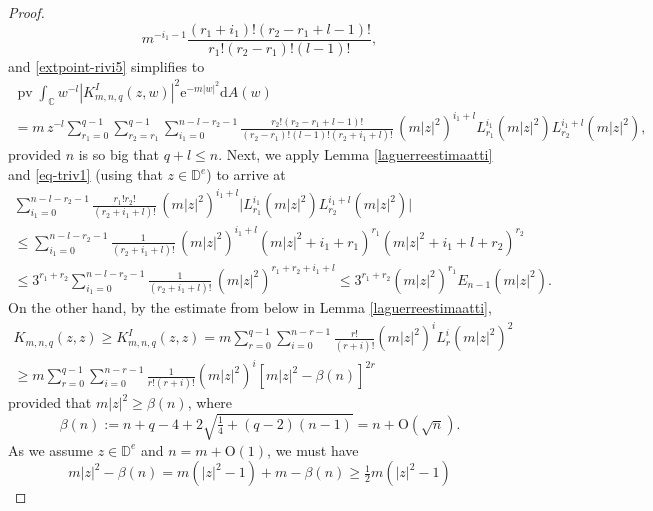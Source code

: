 \documentclass{birkart}
\theoremstyle{definition}
\theoremstyle{remark}
\numberwithin{equation}{section}
\numberwithin{figure}{section}
\newcommand{\e}{\mathrm e}
\newcommand{\1}{{\mathbf 1}}
\newcommand{\Rpar}{q}
\newcommand{\D}{{\mathbb D}}
\newcommand{\Ordo}{\mathrm{O}}
\newcommand{\diff}{{\mathrm d}}
\newcommand{\pv}{\operatorname{\mathrm{pv}}}
\begin{document}
\begin{proof}
\[m^{-i_1-1}\frac{(r_1+i_1)!(r_2-r_1+l-1)!}{r_1!(r_2-r_1)!(l-1)!},
\]
and \eqref{extpoint-rivi5} simplifies to
\begin{multline}
\label{extpoint-rivi5.5}
\pv \int_{\mathbb{C}} w^{-l} 
|K^I_{m,n,\Rpar}(z,w)|^2\e^{-m|w|^2} \diff A(w) 
\\
=m\,z^{-l}
\sum_{r_1=0}^{\Rpar-1}\sum_{r_2=r_1}^{\Rpar-1}\sum_{i_1=0}^{n-l-r_2-1}
\frac{r_2!(r_2-r_1+l-1)!}{(r_2-r_1)!(l-1)!(r_2+i_1+l)!}
\,(m|z|^{2})^{i_1+l}L_{r_1}^{i_1}(m|z|^2)L^{i_1+l}_{r_2}(m|z|^2),
\end{multline}
provided $n$ is so big that $\Rpar+l\le n$. Next, we apply Lemma 
\ref{laguerreestimaatti} and \eqref{eq-triv1} (using that $z\in\D^e$) 
to arrive at
\begin{multline}
\label{extpoint-rivi5.6}
\sum_{i_1=0}^{n-l-r_2-1}\frac{r_1!r_2!}{(r_2+i_1+l)!} 
\,(m|z|^{2})^{i_1+l}\big|L_{r_1}^{i_1}(m|z|^2)L^{i_1+l}_{r_2}(m|z|^2)\big|
\\
\le\sum_{i_1=0}^{n-l-r_2-1}\frac{1}{(r_2+i_1+l)!} 
\,(m|z|^{2})^{i_1+l}(m|z|^2+i_1+r_1)^{r_1}(m|z|^2+i_1+l+r_2)^{r_2}
\\
\le 3^{r_1+r_2}\sum_{i_1=0}^{n-l-r_2-1}\frac{1}{(r_2+i_1+l)!} 
\,(m|z|^{2})^{r_1+r_2+i_1+l}\le 3^{r_1+r_2}(m|z|^2)^{r_1}E_{n-1}(m|z|^2).
\end{multline}
On the other hand, by the estimate from below in Lemma 
\ref{laguerreestimaatti},
\begin{multline} 
\label{berezin-outside-onepointestimate}
K_{m,n,\Rpar}(z,z) \geq K^{I}_{m,n,\Rpar}(z,z)=
m\sum_{r=0}^{\Rpar-1} \sum_{i=0}^{n-r-1} \frac{r!}{(r+i)!} 
(m|z|^2)^i L^{i}_{r}(m|z|^2)^2
\\
\ge m\sum_{r=0}^{\Rpar-1} \sum_{i=0}^{n-r-1} \frac{1}{r!(r+i)!} 
(m|z|^2)^i [m|z|^2-\beta(n)]^{2r}
\end{multline}
provided that $m|z|^2\ge\beta(n)$, where 
\[
\beta(n):=n+q-4+2\sqrt{\tfrac14+(q-2)(n-1)}=n+\Ordo(\sqrt{n}).
\]
As we assume $z\in\D^e$ and $n=m+\Ordo(1)$, we must have
\[
m|z|^2-\beta(n)=m(|z|^2-1)+m-\beta(n)\ge \tfrac12 m(|z|^2-1)
\]
\end{proof}
\end{document}
